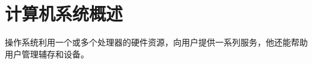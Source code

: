 
\chapter{计算机系统概述}
{
    操作系统利用一个或多个处理器的硬件资源，向用户提供一系列服务，他还能帮助用户管理辅存和设备。

    
    
    
    
    
    
    
    
    
}

\cleardoublepage

\endinput
